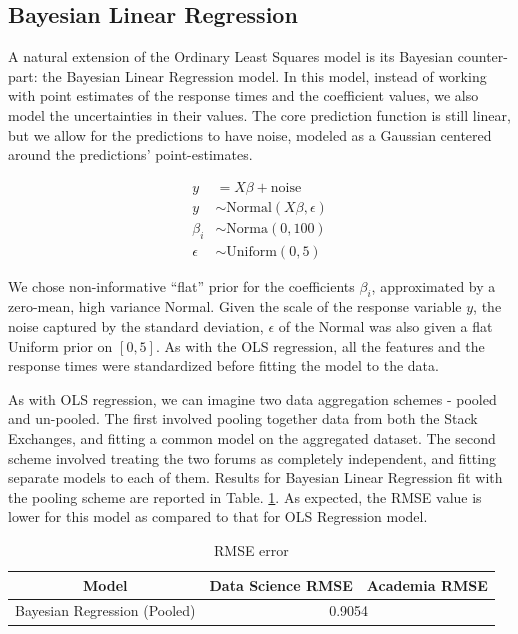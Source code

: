 \documentclass[12pt]{article}
\begin{document}
\subsection{Bayesian Linear Regression}
A natural extension of the Ordinary Least Squares model is its Bayesian counter-part: the Bayesian Linear Regression model. In this model, instead of working with point estimates of the response times and the coefficient values, we also model the uncertainties in their values. The core prediction function is still linear, but we allow for the predictions to have noise, modeled as a Gaussian centered around the predictions' point-estimates.

\begin{align*}
y &=X\beta + \text{noise} \\
y &\sim \text{Normal}(X\beta, \epsilon) \\
\beta_i &\sim \text{Norma}(0, 100) \\
\epsilon &\sim \text{Uniform}(0,5)
\end{align*}

We chose non-informative ``flat'' prior for the coefficients $\beta_i$, approximated by a zero-mean, high variance Normal. Given the scale of the response variable $y$, the noise captured by the standard deviation, $\epsilon$ of the Normal was also given a flat Uniform prior on $\left[0, 5\right]$. As with the OLS regression, all the features and the response times were standardized before fitting the model to the data.

As with OLS regression, we can imagine two data aggregation schemes - pooled and un-pooled. The first involved pooling together data from both the Stack Exchanges, and fitting a common model on the aggregated dataset. The second scheme involved treating the two forums as completely independent, and fitting separate  models to each of them. Results for Bayesian Linear Regression fit with the pooling scheme are reported in Table. \ref{table:bayesian-regression-rmse}. As expected, the RMSE value is lower for this model as compared to that for OLS Regression model.

\begin{table}[ht]
  \centering
  \begin{tabular}{|c|c|c|}\hline
    Model & Data Science RMSE & Academia RMSE   \\ \hline
    Bayesian Regression (Pooled) & \multicolumn{2}{c|}{0.9054} \\ \hline
  \end{tabular}
  \caption{RMSE error}
  \label{table:bayesian-regression-rmse}
\end{table}
\end{document}
